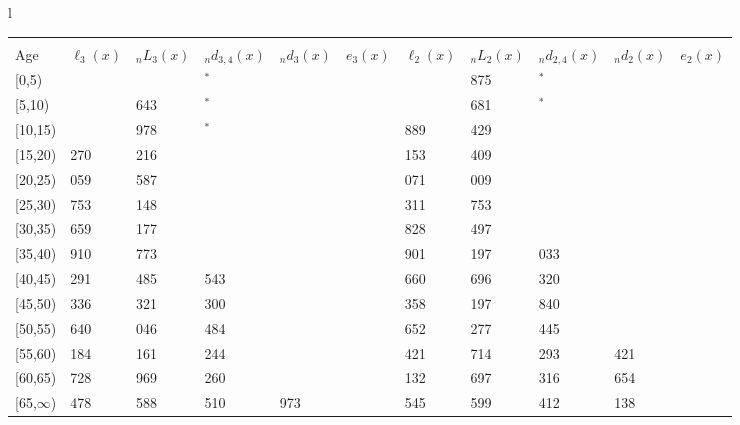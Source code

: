 \documentclass[
]{article}
\begin{document}
\begin{table}
\centering
\begin{tabular}[t]{l}
\hline
\begin{tabular}{>{\raggedright\arraybackslash}p{.43in}>{\raggedleft\arraybackslash}p{.42in}>{\raggedleft\arraybackslash}p{.42in}>{\raggedleft\arraybackslash}p{.42in}>{\raggedleft\arraybackslash}p{.42in}>{\raggedleft\arraybackslash}p{.42in}>{\raggedleft\arraybackslash}p{.42in}>{\raggedleft\arraybackslash}p{.42in}>{\raggedleft\arraybackslash}p{.42in}>{\raggedleft\arraybackslash}p{.42in}>{\raggedleft\arraybackslash}p{.42in}}
\toprule
\multicolumn{1}{c}{ } & \multicolumn{5}{c}{(2) Lost mother only} & \multicolumn{5}{c}{(3) Lost father only} \\
\cmidrule(l{3pt}r{3pt}){2-6} \cmidrule(l{3pt}r{3pt}){7-11}
Age & $\ell_{3}(x)$ & ${}_nL_{3}(x)$ & ${}_nd_{3,4}(x)$ & ${}_nd_{3}(x)$ & $e_{3}(x)$ & $\ell_{2}(x)$ & ${}_nL_{2}(x)$ & ${}_nd_{2,4}(x)$ & ${}_nd_{2}(x)$ & $e_{2}(x)$\\
\midrule
{}[0,5) & 0 & 651 & 8$^{*}$ & 1 & 3 & 0 & 1 875 & 6$^{*}$ & 3 & 10\\
{}[5,10) & 353 & 2 643 & 18$^{*}$ & 0 & 3 & 919 & 6 681 & 15$^{*}$ & 1 & 10\\
{}[10,15) & 736 & 4 978 & 35$^{*}$ & 1 & 3 & 1 889 & 12 429 & 61 & 2 & 10\\
{}[15,20) & 1 270 & 8 216 & 148 & 7 & 3 & 3 153 & 20 409 & 103 & 17 & 10\\
{}[20,25) & 2 059 & 12 587 & 228 & 20 & 3 & 5 071 & 32 009 & 259 & 51 & 10\\
\addlinespace
{}[25,30) & 2 753 & 17 148 & 280 & 34 & 3 & 7 311 & 45 753 & 311 & 91 & 10\\
{}[30,35) & 3 659 & 23 177 & 567 & 57 & 3 & 9 828 & 62 497 & 646 & 153 & 9\\
{}[35,40) & 4 910 & 30 773 & 821 & 90 & 3 & 12 901 & 82 197 & 1 033 & 241 & 9\\
{}[40,45) & 6 291 & 38 485 & 1 543 & 139 & 2 & 16 660 & 105 696 & 2 320 & 381 & 8\\
{}[45,50) & 7 336 & 42 321 & 2 300 & 206 & 2 & 20 358 & 125 197 & 3 840 & 610 & 7\\
\addlinespace
{}[50,55) & 7 640 & 42 046 & 3 484 & 299 & 2 & 22 652 & 136 277 & 6 445 & 969 & 6\\
{}[55,60) & 7 184 & 38 161 & 4 244 & 412 & 1 & 22 421 & 131 714 & 8 293 & 1 421 & 4\\
{}[60,65) & 5 728 & 26 969 & 4 260 & 426 & 1 & 19 132 & 104 697 & 10 316 & 1 654 & 3\\
{}[65,$\infty$) & 3 478 & 33 588 & 6 510 & 1 973 & 0 & 11 545 & 155 599 & 22 412 & 9 138 & 2\\

\end{tabular}
\end{tabular}
\end{table}
\end{document}
